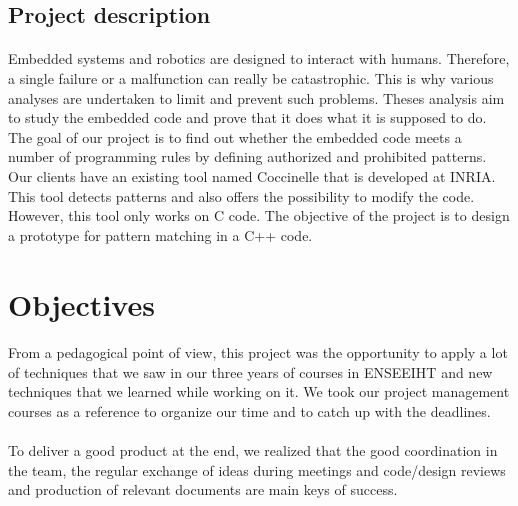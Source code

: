 \documentclass{report}
\begin{document}
\subsection{Project description}

\paragraph{}
\hspace{4mm}\textnormal{Embedded systems and robotics are designed to interact 
with humans. Therefore, a single failure or a malfunction can 
really be catastrophic. This is why various analyses are undertaken
 to limit and prevent such problems. Theses analysis aim to study 
the embedded code and prove that it does what it is supposed to 
do. The goal of our project is to find out whether the embedded 
code meets a number of programming rules by defining authorized
 and prohibited patterns. Our clients have an existing tool named 
Coccinelle that is developed at INRIA. This tool detects patterns 
and also offers the possibility to modify the code. However, this 
tool only works on C code. The objective of the project is to design 
a prototype for pattern matching in a C++ code.}

\section{Objectives}

\paragraph{}
\hspace{4mm}\textnormal{From a pedagogical point of view, this project was the 
opportunity to apply a lot of techniques that we saw in our three 
years of courses in ENSEEIHT and new techniques that we learned
while working on it. We took our project management courses as a reference to 
organize our time and to catch up with the deadlines.}

\paragraph{}
\hspace{4mm}\textnormal{To deliver a good product at the end, we realized that the good coordination
in the team, the regular exchange of ideas during meetings and code/design reviews
and production of relevant documents are main keys of success.}
\end{document}
